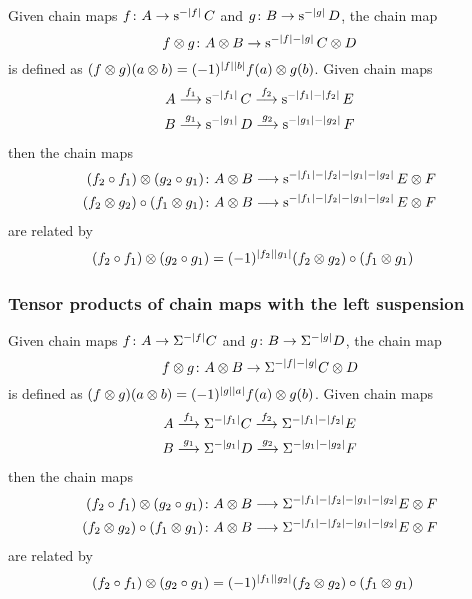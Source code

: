 Given chain maps $f \colon A \to \operatorname{s}^{-|f|}C$ and $g \colon B \to \operatorname{s}^{-|g|}D$, the chain map
\[
f \otimes g \colon A \otimes B \to \operatorname{s}^{-|f|-|g|}C \otimes D
\]
is defined as $(f \otimes g)(a \otimes b) = (-1)^{|f||b|} f(a) \otimes g(b)$. Given chain maps
\begin{align*}
	A & \overset{f_1}{\longrightarrow} \operatorname{s}^{-|f_1|} C \overset{f_2}{\longrightarrow} \operatorname{s}^{-|f_1|-|f_2|} E \\
	B & \overset{g_1}{\longrightarrow} \operatorname{s}^{-|g_1|} D \overset{g_2}{\longrightarrow} \operatorname{s}^{-|g_1|-|g_2|} F \\
\end{align*}
then the chain maps
\begin{align*}
	(f_2\circ f_1) \otimes (g_2\circ g_1) \colon &A \otimes B \longrightarrow \operatorname{s}^{-|f_1|-|f_2|-|g_1|-|g_2|}E \otimes F
	\\
	(f_2 \otimes g_2)\circ (f_1 \otimes g_1) \colon &A \otimes B \longrightarrow \operatorname{s}^{-|f_1|-|f_2|-|g_1|-|g_2|}E \otimes F
\end{align*}
are related by
\begin{align*}
	(f_2\circ f_1) \otimes (g_2\circ g_1) &= (-1)^{|f_2||g_1|}(f_2 \otimes g_2)\circ (f_1 \otimes g_1)
\end{align*}

\subsubsection{Tensor products of chain maps with the left suspension}

Given chain maps $f \colon A \to \Sigma^{-|f|}C$ and $g \colon B \to \Sigma^{-|g|}D$, the chain map
\[
f \otimes g \colon A \otimes B \to \Sigma^{-|f|-|g|}C \otimes D
\]
is defined as $(f \otimes g)(a \otimes b) = (-1)^{|g||a|} f(a) \otimes g(b)$. Given chain maps
\begin{align*}
	A & \overset{f_1}{\longrightarrow} \Sigma^{-|f_1|} C \overset{f_2}{\longrightarrow} \Sigma^{-|f_1|-|f_2|} E \\
	B & \overset{g_1}{\longrightarrow} \Sigma^{-|g_1|} D \overset{g_2}{\longrightarrow} \Sigma^{-|g_1|-|g_2|} F \\
\end{align*}
then the chain maps
\begin{align*}
	(f_2\circ f_1) \otimes (g_2\circ g_1) \colon &A \otimes B \longrightarrow \Sigma^{-|f_1|-|f_2|-|g_1|-|g_2|}E \otimes F
	\\
	(f_2 \otimes g_2)\circ (f_1 \otimes g_1) \colon &A \otimes B \longrightarrow \Sigma^{-|f_1|-|f_2|-|g_1|-|g_2|}E \otimes F
\end{align*}
are related by
\begin{align*}
	(f_2\circ f_1) \otimes (g_2\circ g_1) &= (-1)^{|f_1||g_2|}(f_2 \otimes g_2)\circ (f_1 \otimes g_1)
\end{align*}

